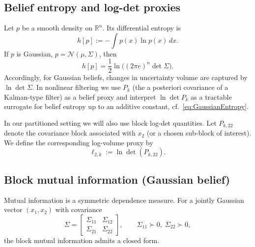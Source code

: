 \documentclass[final,5p,times,twocolumn]{elsarticle}
\begin{document}
\subsection{Belief entropy and log-det proxies}

Let $p$ be a smooth density on $\mathbb{R}^n$. Its differential entropy is
\begin{equation}
	h[p] := -\int p(x)\ln p(x)\,dx.
\end{equation}
If $p$ is Gaussian, $p=\mathcal{N}(\mu,\Sigma)$, then
\begin{equation}
	h[p] = \frac{1}{2}\ln\!\big((2\pi e)^n\det\Sigma\big).
	\label{eq:GaussianEntropy}
\end{equation}
Accordingly, for Gaussian beliefs, changes in uncertainty volume are captured by $\ln\det\Sigma$. In nonlinear filtering we use $P_k$ (the a posteriori covariance of a Kalman-type filter) as a belief proxy and interpret $\ln\det P_k$ as a tractable surrogate for belief entropy up to an additive constant, cf.\ \eqref{eq:GaussianEntropy}.

In our partitioned setting we will also use block log-det quantities. Let $P_{k,22}$ denote the covariance block associated with $x_2$ (or a chosen sub-block of interest). We define the corresponding log-volume proxy by
\begin{equation}
	\ell_{2,k} := \ln\det(P_{k,22}).
	\label{eq:block-logdet}
\end{equation}

\subsection{Block mutual information (Gaussian belief)}

Mutual information is a symmetric dependence measure. For a jointly Gaussian vector $(x_1,x_2)$ with covariance
\begin{equation}
	\Sigma=
	\begin{bmatrix}
		\Sigma_{11} & \Sigma_{12}\\
		\Sigma_{21} & \Sigma_{22}
	\end{bmatrix},\qquad
	\Sigma_{11}\succ 0,\;\Sigma_{22}\succ 0,
	\label{eq:SigmaBlocks}
\end{equation}
the block mutual information admits a closed form.
\end{document}
